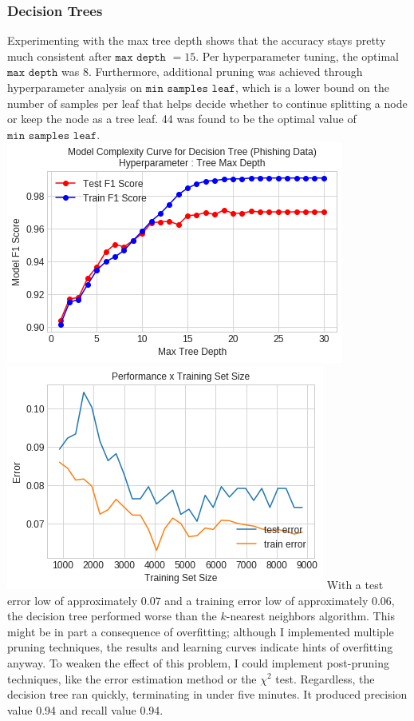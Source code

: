 \documentclass[11pt, a4paper]{article} %
\begin{document}
\subsubsection{Decision Trees}
Experimenting with the max tree depth shows that the accuracy stays pretty much consistent after $\texttt{max depth}$ $=15$. Per hyperparameter tuning, the optimal $\texttt{max depth}$ was 8. Furthermore, additional pruning was achieved through hyperparameter analysis on $\texttt{min samples leaf}$, which is a lower bound on the number of samples per leaf that helps decide whether to continue splitting a node or keep the node as a tree leaf. 44 was found to be the optimal value of $\texttt{min samples leaf}$.
\newline\newline
\includegraphics[scale=0.55]{DT_Model_Complexity_1.png}
\includegraphics[scale=0.55]{DT_LC.png}
\newline\newline
With a test error low of approximately 0.07 and a training error low of approximately 0.06, the decision tree performed worse than the $k$-nearest neighbors algorithm. This might be in part a consequence of overfitting; although I implemented multiple pruning techniques, the results and learning curves indicate hints of overfitting anyway. To weaken the effect of this problem, I could implement post-pruning techniques, like the error estimation method or the $\chi^2$ test. Regardless, the decision tree ran quickly, terminating in under five minutes. It produced precision value 0.94 and recall value 0.94.
\end{document}
